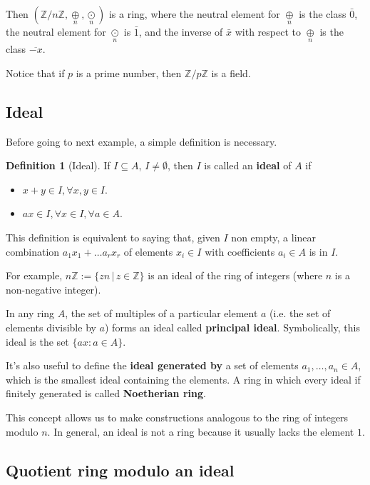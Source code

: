 \documentclass[12pt,a4paper]{article}
\theoremstyle{definition}
\newtheorem{definition}{Definition}[section]
\begin{document}
Then $(\mathbb{Z}/n \mathbb{Z}, \underset{n}{\oplus}, \underset{n}{\odot})$ is a ring, where the neutral element for $\underset{n}{\oplus}$ is the class $\bar{0}$, the neutral element for $\underset{n}{\odot}$ is $\bar{1}$, and the inverse of $\bar{x}$ with respect to $\underset{n}{\oplus}$ is the class $\overline{-x}$.

Notice that if $p$ is a prime number, then $\mathbb{Z} / p\mathbb{Z}$ is a field.

\subsection{Ideal}

Before going to next example, a simple definition is necessary.

\begin{definition}[Ideal]
If \(I \subseteq A\), $I \neq \emptyset$, then \(I\) is called an \textbf{ideal} of \(A\) if
\begin{itemize}
\item
  \(x+y \in I, \forall x, y \in I\).
\item
  \(ax \in I, \forall x \in I, \forall a \in A\).
\end{itemize}
\end{definition}

This definition is equivalent to saying that, given $I$ non empty, a linear combination $a_1x_1 + \ldots a_rx_r$ of elements $x_i \in I$ with coefficients $a_i \in A$ is in $I$.

For example, \(n \mathbb{Z} := \{zn \, | \, z \in \mathbb{Z} \}\) is an ideal of the ring of integers (where \(n\) is a non-negative integer).

In any ring $A$, the set of multiples of a particular element $a$ (i.e. the set of elements divisible by $a$) forms an ideal called \textbf{principal ideal}. Symbolically, this ideal is the set $\{ ax : a \in A \}$.

It's also useful to define the \textbf{ideal generated by} a set of elements $a_1, \ldots, a_n \in A$, which is the smallest ideal containing the elements. A ring in which every ideal if finitely generated is called \textbf{Noetherian ring}.

This concept allows us to make constructions analogous to the ring of integers modulo \(n\). In general, an ideal is not a ring because it usually lacks the element $1$.

\subsection{Quotient ring modulo an ideal}
\end{document}
